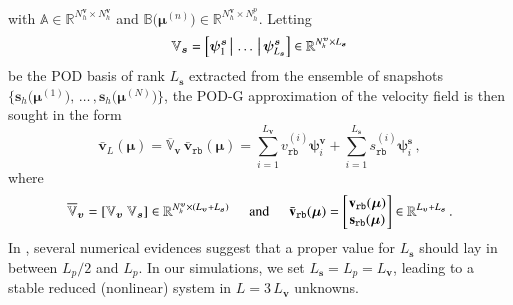 \documentclass[longtitle]{elsarticle}
\numberwithin{equation}{section}
\theoremstyle{theorem}
\theoremstyle{definition}
\theoremstyle{remark}
\theoremstyle{proposition}
\numberwithin{figure}{section}
\newcommand{\bg}[1]{\boldsymbol{#1}}
\begin{document}
		with $\mathbb{A} \in \mathbb{R}^{N_h^{\bg{v}} \times N_h^{\bg{v}}}$ and $\mathbb{B} \big( \bg{\mu}^{(n)} \big) \in \mathbb{R}^{N_h^{\bg{v}} \times N_h^p}$. Letting 
		\vspace*{-0.1cm}
		\begin{equation*}
			\mathbb{V}_{\bg{s}} = \left[ \bg{\psi}_1^{\bg{s}} \, \big| \, \ldots \, \big| \, \bg{\psi}_{L_{\bg{s}}}^{\bg{s}} \right] \in \mathbb{R}^{N_h^{\bg{v}} \times L_{\bg{s}}} 
			\vspace*{-0.1cm}
		\end{equation*}
		be the POD basis of rank $L_{\bg{s}}$ extracted from the ensemble of snapshots $\big\lbrace \mathbf{s}_h \big( \bg{\mu}^{(1)} \big) , \, \ldots \, , \mathbf{s}_h \big( \bg{\mu}^{(N)} \big) \big\rbrace$, the POD-G approximation of the velocity field is then sought in the form
		\vspace*{-0.2cm}
		\begin{equation*}
			\bar{\mathbf{v}}_L(\bg{\mu}) = \overline{\mathbb{V}}_{\bg{v}} \, \bar{\mathbf{v}}_{\texttt{rb}}(\bg{\mu}) = \sum_{i = 1}^{L_{\bg{v}}} v_{\texttt{rb}}^{(i)} \bg{\psi}_i^{\bg{v}} + \sum_{i = 1}^{L_{\bg{s}}} s_{\texttt{rb}}^{(i)} \bg{\psi}_i^{\bg{s}} \, ,
		\end{equation*}
		where
		\begin{equation*}
			\overline{\mathbb{V}}_{\bg{v}} = \left[ \mathbb{V}_{\bg{v}} ~ \mathbb{V}_{\bg{s}} \right] \in \mathbb{R}^{N_h^{\bg{v}} \times (L_{\bg{v}} + L_{\bg{s}})} \hspace*{0.5cm} \text{and} \hspace*{0.5cm} \bar{\mathbf{v}}_{\texttt{rb}}(\bg{\mu}) =
			\begin{bmatrix}
			\hspace*{-0.15cm}
			\begin{array}{c}
				\mathbf{v}_{\texttt{rb}}(\bg{\mu}) \\
				\mathbf{s}_{\texttt{rb}}(\bg{\mu})
			\end{array} 
			\hspace*{-0.15cm}
			\end{bmatrix} 
			\in \mathbb{R}^{L_{\bg{v}} + L_{\bg{s}}} \, .
		\end{equation*}
		In \cite{Bal14}, several numerical evidences suggest that a proper value for $L_{\bg{s}}$ should lay in between $L_p / 2$ and $L_p$. In our simulations, we set $L_{\bg{s}} = L_p = L_{\bg{v}}$, leading to a stable reduced (nonlinear) system in $L = 3 \, L_{\bg{v}}$ unknowns.
\end{document}
